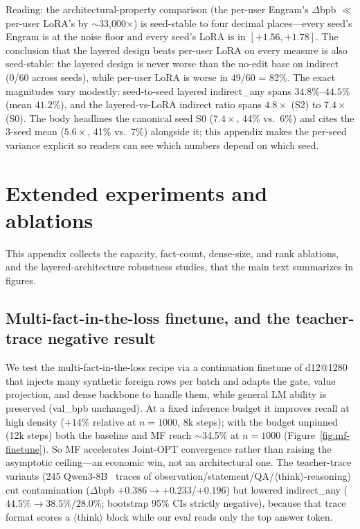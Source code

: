 \documentclass[11pt]{article}
\begin{document}
Reading: the architectural-property comparison (the per-user
Engram's $\Delta$bpb $\ll$ per-user LoRA's by $\sim$33{,}000$\times$) is
seed-stable to four decimal places---every seed's Engram is at the
noise floor and every seed's LoRA is in $[+1.56, +1.78]$. The
conclusion that the layered design beats per-user LoRA on every
measure is also seed-stable: the layered design
is never worse than the no-edit base on indirect (0/60 across seeds),
while per-user LoRA is worse in 49/60 = 82\%. The exact magnitudes vary
modestly: seed-to-seed layered indirect\_any spans $34.8$\%--$44.5$\%
(mean $41.2$\%), and the layered-vs-LoRA indirect ratio spans $4.8\times$
(S2) to $7.4\times$ (S0). The body headlines the canonical seed
S0 ($7.4\times$, 44\% vs.\ 6\%) and cites the 3-seed mean
($5.6\times$, 41\% vs.\ 7\%) alongside it; this appendix makes the
per-seed variance explicit so readers can see which numbers depend
on which seed.

\section{Extended experiments and ablations}
\label{app:extended}

This appendix collects the capacity, fact-count, dense-size, and
rank ablations, and the layered-architecture robustness studies,
that the main text summarizes in figures.

\subsection{Multi-fact-in-the-loss finetune, and the teacher-trace negative result}
\label{sec:mf-finetune}
We test the multi-fact-in-the-loss recipe via a continuation
finetune of d12@1280 that injects many synthetic foreign rows per
batch and adapts the gate, value projection, and dense backbone to
handle them, while general LM ability is preserved (val\_bpb
unchanged). At a fixed inference budget it improves recall at high
density ($+14$\% relative at $n{=}1000$, 8k steps); with the budget
unpinned (12k steps) both the baseline and MF reach $\sim$34.5\% at
$n{=}1000$ (Figure~\ref{fig:mf-finetune}). So MF accelerates Joint-OPT
convergence rather than raising the asymptotic ceiling---an economic
win, not an architectural one. The teacher-trace variants
(245 Qwen3-8B~\citep{qwen2025qwen3} traces of
observation/statement/QA/$\langle$think$\rangle$-reasoning) cut
contamination ($\Delta$bpb $+0.386\to+0.233$/$+0.196$) but lowered
indirect\_any ($44.5\%\to38.5\%$/$28.0\%$; bootstrap 95\% CIs
strictly negative), because that trace format scores a
$\langle$think$\rangle$ block while our eval reads only the top
answer token.
\end{document}
